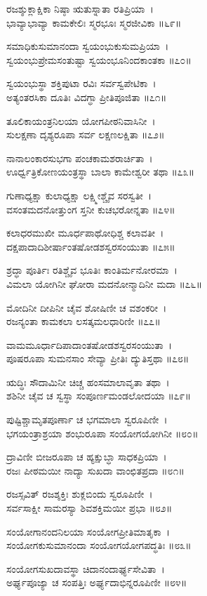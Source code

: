 ರಜಶ್ಶುಕ್ಲಾಕ್ಷಿಕಾ ನಿಷ್ಠಾ ಋತುಸ್ನಾತಾ ರತಿಪ್ರಿಯಾ~।\\
ಭಾವ್ಯಾಭಾವ್ಯಾ ಕಾಮಕೇಲಿಃ ಸ್ಮರಭೂಃ ಸ್ಮರಜೀವಿಕಾ ॥೬೯॥

	ಸಮಾಧಿಕುಸುಮಾನಂದಾ ಸ್ವಯಂಭುಕುಸುಮಪ್ರಿಯಾ~।\\
	ಸ್ವಯಂಭುಪ್ರೇಮಸಂತುಷ್ಟಾ ಸ್ವಯಂಭೂನಿಂದಕಾಂತಕಾ ॥೭೦॥

ಸ್ವಯಂಭುಸ್ಥಾ ಶಕ್ತಿಪುಟಾ ರವಿಃ ಸರ್ವಸ್ವಪೇಟಿಕಾ~।\\
ಅತ್ಯಂತರಸಿಕಾ ದೂತಿಃ ವಿದಗ್ಧಾ ಪ್ರೀತಿಪೂಜಿತಾ ॥೭೧॥

	ತೂಲಿಕಾಯಂತ್ರನಿಲಯಾ ಯೋಗಪೀಠನಿವಾಸಿನೀ~।\\
	ಸುಲಕ್ಷಣಾ ದೃಶ್ಯರೂಪಾ ಸರ್ವ ಲಕ್ಷಣಲಕ್ಷಿತಾ ॥೭೨॥

ನಾನಾಲಂಕಾರಸುಭಗಾ ಪಂಚಕಾಮಶರಾರ್ಚಿತಾ~।\\
ಊರ್ಧ್ವತ್ರಿಕೋಣಯಂತ್ರಸ್ಥಾ ಬಾಲಾ ಕಾಮೇಶ್ವರೀ ತಥಾ ॥೭೩॥

	ಗುಣಾಧ್ಯಕ್ಷಾ ಕುಲಾಧ್ಯಕ್ಷಾ ಲಕ್ಷ್ಮೀಶ್ಚೈವ ಸರಸ್ವತೀ~।\\
	ವಸಂತಮದನೋತ್ತುಂಗ ಸ್ತನೀ ಕುಚಭರೋನ್ನತಾ ॥೭೪॥

ಕಲಾಧರಮುಖೀ ಮೂರ್ಧಪಾಥೋಧಿಶ್ಚ ಕಲಾವತೀ~।\\
ದಕ್ಷಪಾದಾದಿಶೀರ್ಷಾಂತಷೋಡಶಸ್ವರಸಂಯುತಾ ॥೭೫॥

	ಶ್ರದ್ಧಾ ಪೂರ್ತಿಃ ರತಿಶ್ಚೈವ ಭೂತಿಃ ಕಾಂತಿರ್ಮನೋರಮಾ~।\\
	ವಿಮಲಾ ಯೋಗಿನೀ ಘೋರಾ ಮದನೋನ್ಮಾದಿನೀ ಮದಾ ॥೭೬॥

ಮೋದಿನೀ ದೀಪಿನೀ ಚೈವ ಶೋಷಿಣೀ ಚ ವಶಂಕರೀ~।\\
ರಜನ್ಯಂತಾ ಕಾಮಕಲಾ ಲಸತ್ಕಮಲಧಾರಿಣೀ ॥೭೭॥

	ವಾಮಮೂರ್ಧಾದಿಪಾದಾಂತಷೋಡಶಸ್ವರಸಂಯುತಾ~।\\
	ಪೂಷರೂಪಾ ಸುಮನಸಾಂ ಸೇವ್ಯಾ ಪ್ರೀತಿಃ ದ್ಯುತಿಸ್ತಥಾ ॥೭೮॥

ಋದ್ಧಿಃ ಸೌದಾಮಿನೀ ಚಿಚ್ಚ ಹಂಸಮಾಲಾವೃತಾ ತಥಾ~।\\
ಶಶಿನೀ ಚೈವ ಚ ಸ್ವಸ್ಥಾ ಸಂಪೂರ್ಣಮಂಡಲೋದಯಾ ॥೭೯॥

	ಪುಷ್ಟಿಶ್ಚಾಮೃತಪೂರ್ಣಾ ಚ ಭಗಮಾಲಾ ಸ್ವರೂಪಿಣೀ~।\\
	ಭಗಯಂತ್ರಾಶ್ರಯಾ ಶಂಭುರೂಪಾ ಸಂಯೋಗಯೋಗಿನೀ ॥೮೦॥

ದ್ರಾವಿಣೀ ಬೀಜರೂಪಾ ಚ ಹ್ಯಕ್ಷುಬ್ಧಾ ಸಾಧಕಪ್ರಿಯಾ~।\\
ರಜಃ ಪೀಠಮಯೀ ನಾದ್ಯಾ ಸುಖದಾ ವಾಂಛಿತಪ್ರದಾ ॥೮೧॥

	ರಜಸ್ಸವಿತ್ ರಜಶ್ಶಕ್ತಿಃ ಶುಕ್ಲಬಿಂದು ಸ್ವರೂಪಿಣೀ~।\\
	ಸರ್ವಸಾಕ್ಷೀ ಸಾಮರಸ್ಯಾ ಶಿವಶಕ್ತಿಮಯೀ ಪ್ರಭಾ ॥೮೨॥

ಸಂಯೋಗಾನಂದನಿಲಯಾ ಸಂಯೋಗಪ್ರೀತಿಮಾತೃಕಾ~।\\
ಸಂಯೋಗಕುಸುಮಾನಂದಾ ಸಂಯೋಗಯೋಗಪದ್ಧತಿಃ ॥೮೩॥

	ಸಂಯೋಗಸುಖದಾವಸ್ಥಾ ಚಿದಾನಂದಾರ್ಘ್ಯಸೇವಿತಾ~।\\
	ಅರ್ಘ್ಯಪೂಜ್ಯಾ ಚ ಸಂಪತ್ತಿಃ ಅರ್ಘ್ಯದಾಭಿನ್ನರೂಪಿಣೀ ॥೮೪॥


